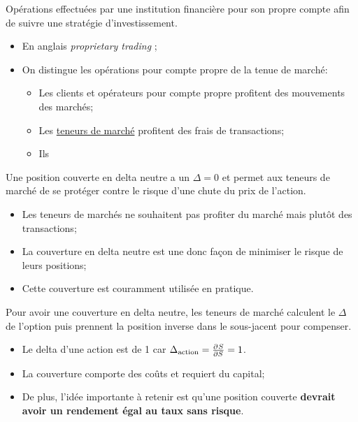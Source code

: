 \documentclass[10pt, french]{article}
\begin{document}
\begin{multicols*}{2}
\begin{definitionNOHFILL}
Opérations effectuées par une institution financière pour son propre compte afin de suivre une stratégie d'investissement.

\begin{itemize}[leftmargin = *]
\item	En anglais \og \textit{proprietary trading} \fg{};
\item	On distingue les opérations pour compte propre de la tenue de marché:
	\begin{itemize}[leftmargin = *]
	\item	Les clients et opérateurs pour compte propre profitent des mouvements des marchés;
	\item	Les \hyperlink{market_holder}{\color{blue}teneurs de marché} profitent des frais de transactions;
	\item	Ils  
	\end{itemize}
\end{itemize}
\end{definitionNOHFILL}

\begin{definitionNOHFILLsub}
Une position couverte en delta neutre a un $\Delta = 0$ et permet aux teneurs de marché de se protéger contre le risque d'une chute du prix de l'action.

\begin{rappel_enhanced}[Contexte]
\begin{itemize}[leftmargin = *]
	\item	Les teneurs de marchés ne souhaitent pas profiter du marché mais plutôt des transactions;
	\item	La couverture en delta neutre est une donc façon de minimiser le risque de leurs positions;
	\item	Cette couverture est couramment utilisée en pratique.
\end{itemize}
\end{rappel_enhanced}

Pour avoir une couverture en delta neutre, les teneurs de marché calculent le $\Delta$ de l'option puis prennent la position inverse dans le sous-jacent pour compenser. 
\begin{itemize}[leftmargin = *]
	\item	Le delta d'une action est de 1 car $\Delta_{\text{action}}	=	\frac{\partial^{}S}{\partial S^{}} = 1$.
	\item	La couverture comporte des coûts et requiert du capital;
	\item	De plus, l'idée importante à retenir est qu'une position couverte \textbf{devrait avoir un rendement égal au taux sans risque}.
\end{itemize}


\end{definitionNOHFILLsub}
\end{multicols*}
\end{document}
